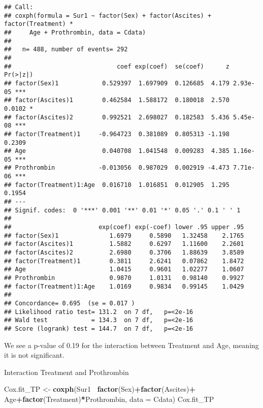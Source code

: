 \documentclass[
]{article}
\newenvironment{Shaded}{\begin{snugshade}}{\end{snugshade}}
\newcommand{\DataTypeTok}[1]{\textcolor[rgb]{0.13,0.29,0.53}{#1}}
\newcommand{\KeywordTok}[1]{\textcolor[rgb]{0.13,0.29,0.53}{\textbf{#1}}}
\newcommand{\NormalTok}[1]{#1}
\newcommand{\OperatorTok}[1]{\textcolor[rgb]{0.81,0.36,0.00}{\textbf{#1}}}
\newcommand{\StringTok}[1]{\textcolor[rgb]{0.31,0.60,0.02}{#1}}
\begin{document}
\begin{verbatim}
## Call:
## coxph(formula = Sur1 ~ factor(Sex) + factor(Ascites) + factor(Treatment) * 
##     Age + Prothrombin, data = Cdata)
## 
##   n= 488, number of events= 292 
## 
##                             coef exp(coef)  se(coef)      z Pr(>|z|)    
## factor(Sex)1            0.529397  1.697909  0.126685  4.179 2.93e-05 ***
## factor(Ascites)1        0.462584  1.588172  0.180018  2.570   0.0102 *  
## factor(Ascites)2        0.992521  2.698027  0.182583  5.436 5.45e-08 ***
## factor(Treatment)1     -0.964723  0.381089  0.805313 -1.198   0.2309    
## Age                     0.040708  1.041548  0.009283  4.385 1.16e-05 ***
## Prothrombin            -0.013056  0.987029  0.002919 -4.473 7.71e-06 ***
## factor(Treatment)1:Age  0.016710  1.016851  0.012905  1.295   0.1954    
## ---
## Signif. codes:  0 '***' 0.001 '**' 0.01 '*' 0.05 '.' 0.1 ' ' 1
## 
##                        exp(coef) exp(-coef) lower .95 upper .95
## factor(Sex)1              1.6979     0.5890   1.32458    2.1765
## factor(Ascites)1          1.5882     0.6297   1.11600    2.2601
## factor(Ascites)2          2.6980     0.3706   1.88639    3.8589
## factor(Treatment)1        0.3811     2.6241   0.07862    1.8472
## Age                       1.0415     0.9601   1.02277    1.0607
## Prothrombin               0.9870     1.0131   0.98140    0.9927
## factor(Treatment)1:Age    1.0169     0.9834   0.99145    1.0429
## 
## Concordance= 0.695  (se = 0.017 )
## Likelihood ratio test= 131.2  on 7 df,   p=<2e-16
## Wald test            = 134.3  on 7 df,   p=<2e-16
## Score (logrank) test = 144.7  on 7 df,   p=<2e-16
\end{verbatim}

We see a p-value of 0.19 for the interaction between Treatment and Age,
meaning it is not significant.

Interaction Treatment and Prothrombin

\begin{Shaded}
\begin{Highlighting}[]
\NormalTok{Cox.fit_TP <-}\StringTok{ }\KeywordTok{coxph}\NormalTok{(Sur1}\OperatorTok{~}\StringTok{ }\KeywordTok{factor}\NormalTok{(Sex)}\OperatorTok{+}\KeywordTok{factor}\NormalTok{(Ascites)}\OperatorTok{+}\StringTok{ }\NormalTok{Age}\OperatorTok{+}\KeywordTok{factor}\NormalTok{(Treatment)}\OperatorTok{*}\NormalTok{Prothrombin, }\DataTypeTok{data =}\NormalTok{ Cdata)}
\NormalTok{Cox.fit_TP}
\end{Highlighting}
\end{Shaded}
\end{document}
